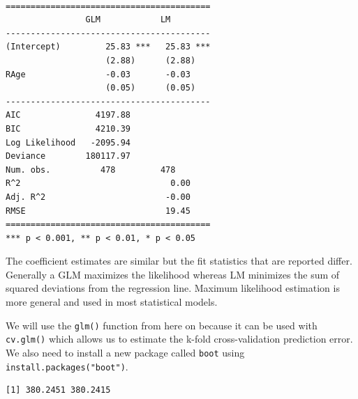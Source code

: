 \documentclass[]{article}
\newenvironment{Shaded}{\begin{snugshade}}{\end{snugshade}}
\newcommand{\CommentTok}[1]{\textcolor[rgb]{0.56,0.35,0.01}{\textit{#1}}}
\newcommand{\KeywordTok}[1]{\textcolor[rgb]{0.13,0.29,0.53}{\textbf{#1}}}
\newcommand{\NormalTok}[1]{#1}
\newcommand{\OperatorTok}[1]{\textcolor[rgb]{0.81,0.36,0.00}{\textbf{#1}}}
\newcommand{\StringTok}[1]{\textcolor[rgb]{0.31,0.60,0.02}{#1}}
\begin{document}
\begin{verbatim}

=========================================
                GLM            LM        
-----------------------------------------
(Intercept)         25.83 ***   25.83 ***
                    (2.88)      (2.88)   
RAge                -0.03       -0.03    
                    (0.05)      (0.05)   
-----------------------------------------
AIC               4197.88                
BIC               4210.39                
Log Likelihood   -2095.94                
Deviance        180117.97                
Num. obs.          478         478       
R^2                              0.00    
Adj. R^2                        -0.00    
RMSE                            19.45    
=========================================
*** p < 0.001, ** p < 0.01, * p < 0.05
\end{verbatim}

The coefficient estimates are similar but the fit statistics that are reported differ. Generally a GLM maximizes the likelihood whereas LM minimizes the sum of squared deviations from the regression line. Maximum likelihood estimation is more general and used in most statistical models.

We will use the \texttt{glm()} function from here on because it can be used with \texttt{cv.glm()} which allows us to estimate the k-fold cross-validation prediction error. We also need to install a new package called \texttt{boot} using \texttt{install.packages("boot")}.

\begin{Shaded}
\end{Shaded}

\begin{verbatim}
[1] 380.2451 380.2415
\end{verbatim}

\begin{Shaded}
\end{Shaded}
\end{document}
